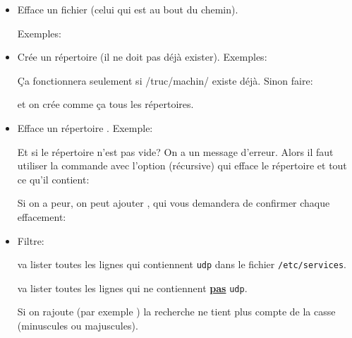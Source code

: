 \begin{itemize}
\item {}

  Efface un fichier (celui qui est au bout du chemin). 

  Exemples:
  
  
  
 \item   {}

   Crée un répertoire (il ne doit pas déjà exister). Exemples:



   Ça fonctionnera seulement si  /truc/machin/ existe déjà. Sinon
   faire:
   

   et on crée comme ça tous les répertoires.
 \item {}

   Efface un répertoire . Exemple:


   Et si le répertoire n'est pas vide? On a un message d'erreur. Alors
   il faut utiliser la 
   commande  avec l'option  (récursive) qui efface le
   répertoire et tout ce qu'il contient:


   Si on a peur, on peut ajouter , qui vous demandera de
   confirmer chaque effacement:


 \item Filtre: 

     va lister toutes les lignes qui
   contiennent \texttt{udp} dans le fichier \texttt{/etc/services}.

     va lister toutes les lignes qui ne
   contiennent \underline{\textbf{\large pas}} \texttt{udp}.

   Si on rajoute  (par exemple ) la recherche ne tient plus compte de la casse
   (minuscules ou majuscules).

\end{itemize}
\exo{}

